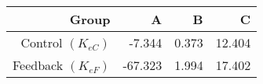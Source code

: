\begin{tabular}{*{4}{r}}
    \toprule
    Group & A & B & C                        \\
    \midrule
    Control $(K_{eC})$ & -7.344 & 0.373 & 12.404 \\
    Feedback  $(K_{eF})$ & -67.323 & 1.994 & 17.402 \\ 
    \bottomrule
\end{tabular}

